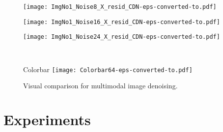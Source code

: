 \documentclass{article}
\begin{document}
\begin{figure*}[th]
\begin{multicols}{2}
\begin{minipage}[b]{0.28\linewidth}
			\centering
			\texttt{[image: ImgNo1\_Noise8\_X\_resid\_CDN-eps-converted-to.pdf]}
		\end{minipage} 
		\begin{minipage}[b]{0.28\linewidth}
			\centering
			\texttt{[image: ImgNo1\_Noise16\_X\_resid\_CDN-eps-converted-to.pdf]}
		\end{minipage} 
		\begin{minipage}[b]{0.28\linewidth}
			\centering
			\texttt{[image: ImgNo1\_Noise24\_X\_resid\_CDN-eps-converted-to.pdf]}
		\end{minipage} 
		\\
		\begin{minipage}[b]{0.1\linewidth}
			\centering	%
		\end{minipage}
		\begin{minipage}[b]{0.28\linewidth}
		\end{minipage} 
		\begin{minipage}[b]{0.28\linewidth}
		\end{minipage} 
		\begin{minipage}[b]{0.28\linewidth}
		\end{minipage}
	\end{multicols}	
	
	\vspace{-0.8cm}
	
	\begin{multicols}{1}  
	\begin{minipage}[b]{0.98\linewidth}{\footnotesize Colorbar}
		\texttt{[image: Colorbar64-eps-converted-to.pdf]}
	\end{minipage}
	\end{multicols}	

	\vspace{-0.6cm}

	\caption{Visual comparison for multimodal image denoising.}
	\label{Fig:DenoisedIms}
\end{figure*}


\section{Experiments}
\label{sec:Experiments}

\vspace{-0.2cm}
\end{document}
